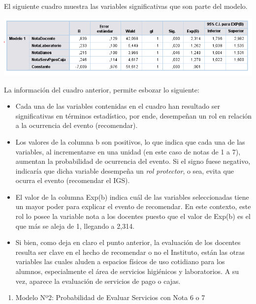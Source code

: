 \documentclass[]{book}
\providecommand{\tightlist}{%
  \setlength{\itemsep}{0pt}\setlength{\parskip}{0pt}}
\begin{document}
El siguiente cuadro muestra las variables significativas que son parte
del modelo.

\begin{center}\includegraphics{images/Modelo1} \end{center}

La información del cuadro anterior, permite esbozar lo siguiente:

\begin{itemize}
\item
  Cada una de las variables contenidas en el cuadro han resultado ser
  significativas en términos estadístico, por ende, desempeñan un rol en
  relación a la ocurrencia del evento (recomendar).
\item
  Los valores de la columna b son positivos, lo que indica que cada una
  de las variables, al incrementarse en una unidad (en este caso de
  notas de 1 a 7), aumentan la probabilidad de ocurrencia del evento. Si
  el signo fuese negativo, indicaría que dicha variable desempeña un
  \emph{rol protector}, o sea, evita que ocurra el evento (recomendar el
  IGS).
\item
  El valor de la columna Exp(b) indica cuál de las variables
  seleccionadas tiene un mayor poder para explicar el evento de
  recomendar. En este contexto, este rol lo posee la variable nota a los
  docentes puesto que el valor de Exp(b) es el que más se aleja de 1,
  llegando a 2,314.
\item
  Si bien, como deja en claro el punto anterior, la evaluación de los
  docentes resulta ser clave en el hecho de recomendar o no el
  Instituto, están las otras variables las cuales aluden a espacios
  físicos de uso cotidiano para los alumnos, especialmente el área de
  servicios higiénicos y laboratorios. A su vez, aparece la evaluación
  de servicios de pago o cajas.
\end{itemize}

\begin{enumerate}
\def\labelenumi{\alph{enumi})}
\setcounter{enumi}{1}
\tightlist
\item
  Modelo Nº2: Probabilidad de Evaluar Servicios con Nota 6 o 7
\end{enumerate}
\end{document}
